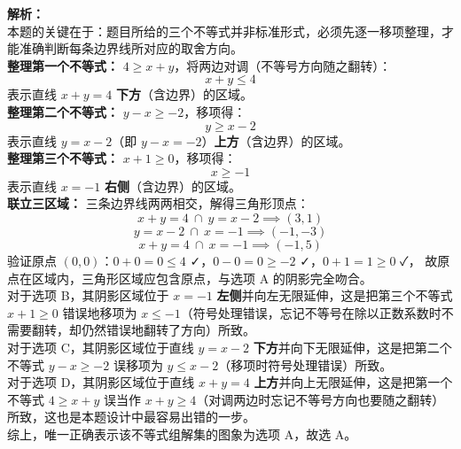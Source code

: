 \documentclass[12pt,a4paper]{exam-zh}
\begin{document}
\begin{question}
\begin{choices}
        \item
    \end{choices}
\end{question}

\begin{solution}
    \textbf{解析：} \\
    本题的关键在于：题目所给的三个不等式并非标准形式，必须先逐一移项整理，才能准确判断每条边界线所对应的取舍方向。 \\[4pt]
    \textbf{整理第一个不等式：} $4 \geq x + y$，将两边对调（不等号方向随之翻转）：
    \[ \displaystyle x + y \leq 4 \]
    表示直线 $x+y=4$ \textbf{下方}（含边界）的区域。 \\[4pt]
    \textbf{整理第二个不等式：} $y - x \geq -2$，移项得：
    \[ \displaystyle y \geq x - 2 \]
    表示直线 $y=x-2$（即 $y-x=-2$）\textbf{上方}（含边界）的区域。 \\[4pt]
    \textbf{整理第三个不等式：} $x + 1 \geq 0$，移项得：
    \[ \displaystyle x \geq -1 \]
    表示直线 $x=-1$ \textbf{右侧}（含边界）的区域。 \\[4pt]
    \textbf{联立三区域：} 三条边界线两两相交，解得三角形顶点：
    \[ \displaystyle x+y=4 \ \cap \ y=x-2 \implies (3,1) \]
    \[ \displaystyle y=x-2 \ \cap \ x=-1 \implies (-1,-3) \]
    \[ \displaystyle x+y=4 \ \cap \ x=-1 \implies (-1,5) \]
    验证原点 $(0,0)$：$0+0=0\leq4$ ✓，$0-0=0\geq-2$ ✓，$0+1=1\geq0$ ✓，
    故原点在区域内，三角形区域应包含原点，与选项 A 的阴影完全吻合。 \\[4pt]
    对于选项 B，其阴影区域位于 $x=-1$ \textbf{左侧}并向左无限延伸，这是把第三个不等式 $x+1\geq0$ 错误地移项为 $x \leq -1$（符号处理错误，忘记不等号在除以正数系数时不需要翻转，却仍然错误地翻转了方向）所致。 \\
    对于选项 C，其阴影区域位于直线 $y=x-2$ \textbf{下方}并向下无限延伸，这是把第二个不等式 $y-x\geq-2$ 误移项为 $y\leq x-2$（移项时符号处理错误）所致。 \\
    对于选项 D，其阴影区域位于直线 $x+y=4$ \textbf{上方}并向上无限延伸，这是把第一个不等式 $4\geq x+y$ 误当作 $x+y\geq4$（对调两边时忘记不等号方向也要随之翻转）所致，这也是本题设计中最容易出错的一步。 \\[4pt]
    综上，唯一正确表示该不等式组解集的图象为选项 A，故选 A。
\end{solution}
\end{document}
